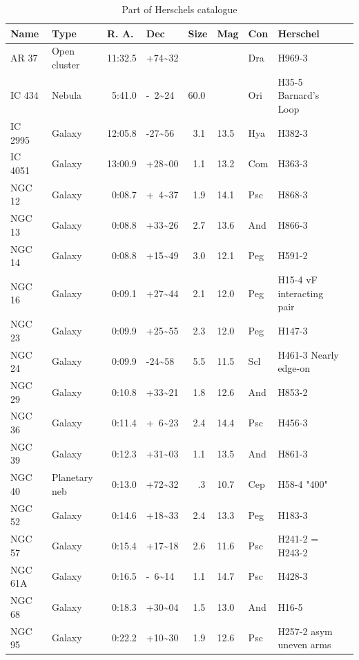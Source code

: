 \documentclass[12pt,a4paper]{article}
\numberwithin{equation}{section}
\numberwithin{figure}{section}
\numberwithin{table}{section}
\begin{document}
\begin{table}[h]
\ttfamily
\tiny
\centering
\begin{tabular}{l l l l l l l l l}
Name & Type & R. A. & Dec & Size & Mag & Con & Herschel \\ \hline
AR 37 & Open cluster & 11:32.5 & +74\~{}32 & & & Dra & H969-3 \\
IC  434 & Nebula & ~5:41.0 & -~2\~{}24 & 60.0 & & Ori & H35-5  Barnard's Loop\\
IC 2995 & Galaxy & 12:05.8 & -27\~{}56 & ~3.1 & 13.5 & Hya & H382-3\\
IC 4051 & Galaxy & 13:00.9 & +28\~{}00 & ~1.1 & 13.2 & Com & H363-3\\
NGC 12 & Galaxy & ~0:08.7 & +~4\~{}37 & ~1.9 & 14.1 & Psc & H868-3\\
NGC 13 & Galaxy & ~0:08.8 & +33\~{}26 & ~2.7 & 13.6 & And & H866-3\\
NGC 14 & Galaxy & ~0:08.8 & +15\~{}49 & ~3.0 & 12.1 & Peg & H591-2\\
NGC 16 & Galaxy & ~0:09.1 & +27\~{}44 & ~2.1 & 12.0 & Peg & H15-4 vF interacting pair\\
NGC 23 & Galaxy & ~0:09.9 & +25\~{}55 & ~2.3 & 12.0 & Peg & H147-3\\
NGC 24 & Galaxy & ~0:09.9 & -24\~{}58 & ~5.5 & 11.5 & Scl & H461-3 Nearly edge-on\\
NGC 29 & Galaxy & ~0:10.8 & +33\~{}21 & ~1.8 & 12.6 & And & H853-2\\
NGC 36 & Galaxy & ~0:11.4 & +~6\~{}23 & ~2.4 & 14.4 & Psc & H456-3\\
NGC 39 & Galaxy & ~0:12.3 & +31\~{}03 & ~1.1 & 13.5 & And & H861-3\\
NGC 40 & Planetary neb & ~0:13.0 & +72\~{}32 & ~~.3 & 10.7 & Cep & H58-4 "400"\\
NGC 52 & Galaxy & ~0:14.6 & +18\~{}33 & ~2.4 & 13.3 & Peg & H183-3  \\
NGC 57 & Galaxy & ~0:15.4 & +17\~{}18 & ~2.6 & 11.6 & Psc & H241-2 = H243-2\\
NGC 61A & Galaxy & ~0:16.5 & -~6\~{}14 & ~1.1 & 14.7 & Psc & H428-3\\
NGC 68 & Galaxy & ~0:18.3 & +30\~{}04 & ~1.5 & 13.0 & And & H16-5\\
NGC 95 & Galaxy & ~0:22.2 & +10\~{}30 & ~1.9 & 12.6 & Psc & H257-2 asym uneven arms\\
\hline
\end{tabular}
\rmfamily
\caption{Part of Herschels catalogue}\label{tab:hers}
\end{table}
\end{document}

